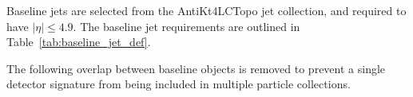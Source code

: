 \begin{table}[ht]
  \caption{Baseline muon requirements.}
  \label{tab:baseline_mu_def}
\end{table}

Baseline jets are selected from the AntiKt4LCTopo jet collection, and required
to have $|\eta| \leq 4.9$.
The baseline jet requirements are outlined in Table~\ref{tab:baseline_jet_def}.

\begin{table}[ht]
    \caption{Baseline jet requirements.}
    \label{tab:baseline_jet_def}
\end{table}

The following overlap between baseline objects is removed to prevent a single
detector signature from being included in multiple particle collections. 

